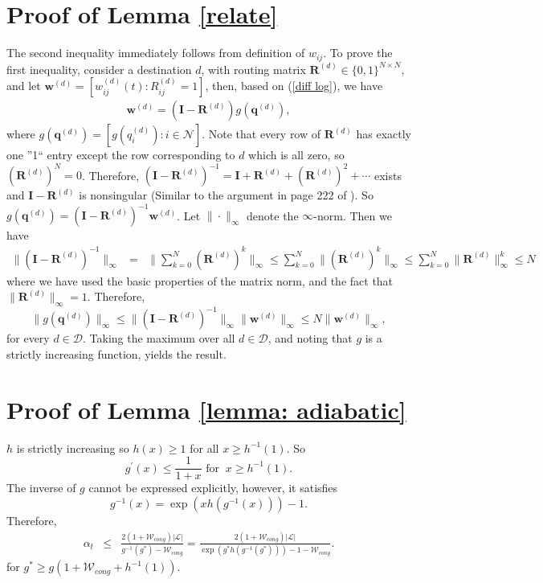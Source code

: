 \documentclass[10pt,onecolumn,draftclsnofoot,journal]{IEEEtran}
\newcommand{\mW} {\mathcal{W}}
\newcommand{\ben}{\begin{eqnarray*}}
\newcommand{\een}{\end{eqnarray*}}
\begin{document}
\section{Proof of Lemma \ref{relate}}
The second inequality immediately follows from definition of $w_{ij}$. To prove the first inequality, consider a destination $d$, with routing matrix $\mathbf{R}^{(d)} \in \{0,1\}^{N \times N}$, and let $\mathbf{w}^{(d)}=[w_{ij}^{(d)}(t): R^{(d)}_{ij}=1]$, then, based on (\ref{diff log}), we have
\ben
\mathbf{w}^{(d)}=(\mathbf{I}-\mathbf{R}^{(d)})g(\mathbf{q}^{(d)}),
\een
where $g(\mathbf{q}^{(d)})=[g(q_i^{(d)}): i \in \mathcal{N}].$ Note that every row of $\mathbf{R}^{(d)}$ has exactly one ''1`` entry except the row corresponding to $d$ which is all zero, so $(\mathbf{R}^{(d)})^N=0$. Therefore, $(\mathbf{I}-\mathbf{R}^{(d)})^{-1}=\mathbf{I}+\mathbf{R}^{(d)}+(\mathbf{R}^{(d)})^2+ \cdots $ exists and $\mathbf{I}-\mathbf{R}^{(d)}$ is nonsingular (Similar to the argument in page 222 of \cite{data}). So $
g(\mathbf{q}^{(d)})=(\mathbf{I}-\mathbf{R}^{(d)})^{-1}\mathbf{w}^{(d)}$. Let $\|\cdot \|_{\infty}$ denote the $\infty$-norm. Then we have
\ben
\|(\mathbf{I}-\mathbf{R}^{(d)})^{-1}\|_{\infty} &=&  \|\sum_{k=0}^N (\mathbf{R}^{(d)})^k\|_{\infty}
 \leq  \sum_{k=0}^N \|(\mathbf{R}^{(d)})^k\|_{\infty}
\leq  \sum_{k=0}^N \|\mathbf{R}^{(d)}\|_{\infty}^k
 \leq  N
\een
where we have used the basic properties of the matrix norm, and the fact that $\|\mathbf{R}^{(d)}\|_{\infty}=1$. Therefore,
$$ \|g(\mathbf{q}^{(d)})\|_{\infty} \leq \|(\mathbf{I}-\mathbf{R}^{(d)})^{-1}\|_{\infty}  \|\mathbf{w}^{(d)}\|_{\infty} \leq N \|\mathbf{w}^{(d)}\|_{\infty},$$
for every $d \in \mathcal{D}$. Taking the maximum over all $d \in \mathcal{D}$, and noting that $g$ is a strictly increasing function, yields the result.
\section{Proof of Lemma \ref{lemma: adiabatic}}
$h$ is strictly increasing so $h(x) \geq 1$ for all $x \geq h^{-1}(1)$. So
\begin{equation}
g^\prime(x) \leq \frac{1}{1+x}\mbox{ for } \ x \geq h^{-1}(1).
\end{equation}
The inverse of $g$ cannot be expressed explicitly, however, it satisfies
\begin{equation}\label{g-1}
g^{-1}(x)=\exp(xh(g^{-1}(x)))-1.
\end{equation}
Therefore,
\begin{eqnarray}
\alpha_t  & \leq &  \frac{2(1+\mW_{cong})|\mathcal{L}|}{g^{-1}(g^*)-\mW_{cong}}  = \frac{2(1+\mW_{cong})|\mathcal{L}|}{\exp(g^*h(g^{-1}(g^*)))-1-\mW_{cong}}.\label{help1}
\end{eqnarray}
for $g^* \geq g(1+\mW_{cong}+h^{-1}(1))$.
\end{document}
